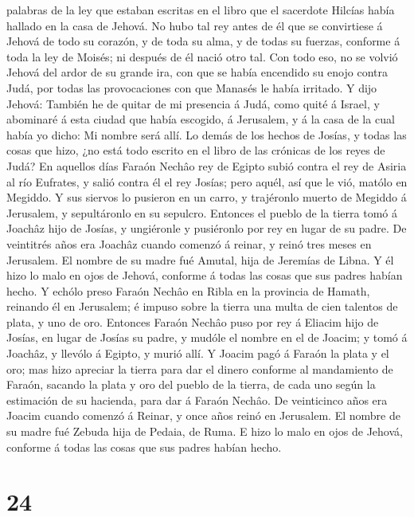 palabras de la ley que estaban escritas en el libro que el sacerdote
Hilcías había hallado en la casa de Jehová.  No hubo tal
rey antes de él que se convirtiese á Jehová de todo su corazón, y de
toda su alma, y de todas su fuerzas, conforme á toda la ley de Moisés;
ni después de él nació otro tal.  Con todo eso, no se
volvió Jehová del ardor de su grande ira, con que se había encendido su
enojo contra Judá, por todas las provocaciones con que Manasés le había
irritado.  Y dijo Jehová: También he de quitar de mi
presencia á Judá, como quité á Israel, y abominaré á esta ciudad que
había escogido, á Jerusalem, y á la casa de la cual había yo dicho: Mi
nombre será allí.  Lo demás de los hechos de Josías, y
todas las cosas que hizo, ¿no está todo escrito en el libro de las
crónicas de los reyes de Judá?  En aquellos días Faraón
Nechâo rey de Egipto subió contra el rey de Asiria al río Eufrates, y
salió contra él el rey Josías; pero aquél, así que le vió, matólo en
Megiddo.  Y sus siervos lo pusieron en un carro, y
trajéronlo muerto de Megiddo á Jerusalem, y sepultáronlo en su sepulcro.
Entonces el pueblo de la tierra tomó á Joachâz hijo de Josías, y
ungiéronle y pusiéronlo por rey en lugar de su padre.  De
veintitrés años era Joachâz cuando comenzó á reinar, y reinó tres meses
en Jerusalem. El nombre de su madre fué Amutal, hija de Jeremías de
Libna.  Y él hizo lo malo en ojos de Jehová, conforme á
todas las cosas que sus padres habían hecho.  Y echólo
preso Faraón Nechâo en Ribla en la provincia de Hamath, reinando él en
Jerusalem; é impuso sobre la tierra una multa de cien talentos de plata,
y uno de oro.  Entonces Faraón Nechâo puso por rey á
Eliacim hijo de Josías, en lugar de Josías su padre, y mudóle el nombre
en el de Joacim; y tomó á Joachâz, y llevólo á Egipto, y murió allí.
 Y Joacim pagó á Faraón la plata y el oro; mas hizo
apreciar la tierra para dar el dinero conforme al mandamiento de Faraón,
sacando la plata y oro del pueblo de la tierra, de cada uno según la
estimación de su hacienda, para dar á Faraón Nechâo.  De
veinticinco años era Joacim cuando comenzó á Reinar, y once años reinó
en Jerusalem. El nombre de su madre fué Zebuda hija de Pedaia, de Ruma.
 E hizo lo malo en ojos de Jehová, conforme á todas las
cosas que sus padres habían hecho.

\hypertarget{section-23}{%
\section{24}\label{section-23}}

